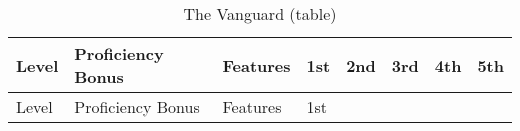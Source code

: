 \begin{longtable}[]{@{}
  >{\raggedright\arraybackslash}p{}
  >{\raggedright\arraybackslash}p{}
  >{\raggedright\arraybackslash}p{}
  >{\raggedright\arraybackslash}p{}
  >{\raggedright\arraybackslash}p{}
  >{\raggedright\arraybackslash}p{}
  >{\raggedright\arraybackslash}p{}
  >{\raggedright\arraybackslash}p{}@{}}
\caption{The Vanguard (table)}\label{vanguard-table}\tabularnewline
\toprule\noalign{}
\begin{minipage}[b]{\linewidth}\raggedright
Level
\end{minipage} & \begin{minipage}[b]{\linewidth}\raggedright
Proficiency Bonus
\end{minipage} & \begin{minipage}[b]{\linewidth}\raggedright
Features
\end{minipage} & \begin{minipage}[b]{\linewidth}\centering
1st
\end{minipage} & \begin{minipage}[b]{\linewidth}\centering
2nd
\end{minipage} & \begin{minipage}[b]{\linewidth}\centering
3rd
\end{minipage} & \begin{minipage}[b]{\linewidth}\centering
4th
\end{minipage} & \begin{minipage}[b]{\linewidth}\centering
5th
\end{minipage} \\
\midrule\noalign{}
\endfirsthead
\toprule\noalign{}
\begin{minipage}[b]{\linewidth}\raggedright
Level
\end{minipage} & \begin{minipage}[b]{\linewidth}\raggedright
Proficiency Bonus
\end{minipage} & \begin{minipage}[b]{\linewidth}\raggedright
Features
\end{minipage} & \begin{minipage}[b]{\linewidth}\centering
1st
\end{minipage} & \begin{minipage}[b]{\linewidth}\centering

\end{minipage}
\end{longtable}
